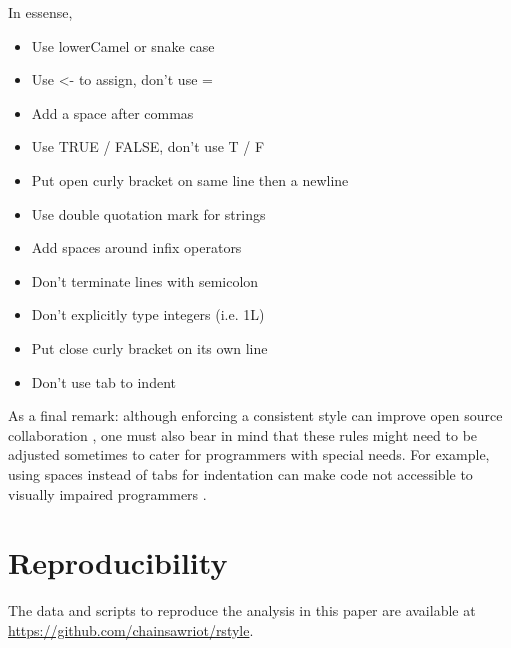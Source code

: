 In essense,

\begin{itemize}
  \item Use lowerCamel or snake case
  \item Use <- to assign, don't use =
  \item Add a space after commas
  \item Use TRUE / FALSE, don't use T / F
  \item Put open curly bracket on same line then a newline
  \item Use double quotation mark for strings
  \item Add spaces around infix operators
  \item Don't terminate lines with semicolon
  \item Don’t explicitly type integers (i.e. 1L)
  \item Put close curly bracket on its own line
  \item Don't use tab to indent
\end{itemize}

As a final remark: although enforcing a consistent style can improve open source collaboration \citep{wang}, one must also bear in mind that these rules might need to be adjusted sometimes to cater for programmers with special needs. For example, using spaces instead of tabs for indentation can make code not accessible to visually impaired programmers \citep{mosal}.

\section{Reproducibility}

The data and scripts to reproduce the analysis in this paper are available at \url{https://github.com/chainsawriot/rstyle}.



\address{Chia-Yi Yen\\
  Mannheim Business School, Universit\"at Mannheim\\
  L 5, 6, 68131 Mannheim\\
  Germany\\
  \url{https://orcid.org/0000-0003-1209-7789}\\
  }

\address{Mia Huai-Wen Chang\\
  Akelius Residential Property AB\\
  Erkelenzdamm 11-13, 10999 Berlin\\
  Germany\\
  }

\address{Chung-hong Chan\\
  Mannheimer Zentrum f\"ur Europ\"aische Sozialforschung, Universit\"at Mannheim\\
  A5, 6,  68159 Mannheim\\
  Germany\\
  \url{https://orcid.org/0000-0002-6232-7530}\\
  }
